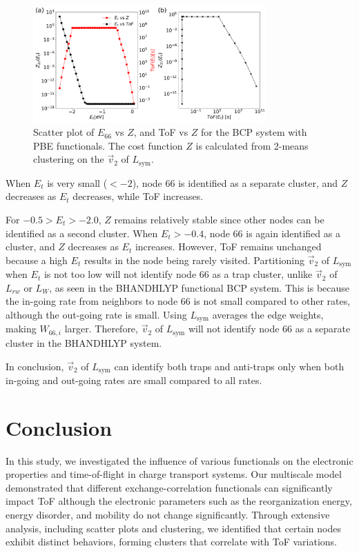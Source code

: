 \documentclass[letterpaper,12pt]{article}
\begin{document}
\begin{figure}
    \centering
    \includegraphics[width=0.8\textwidth]{figs/fig_E_ToF_Z_sym.pdf}
    \caption{Scatter plot of $E_{66}$ vs $Z$, and ToF vs $Z$ for the BCP system with PBE functionals. The cost function $Z$ is calculated from 2-means clustering on the $\vec{v}_2$ of $L_\text{sym}$.}
    \label{fig:fig_E_ToF_Z2_1}
\end{figure}

When $E_t$ is very small ($<-2$), node 66 is identified as a separate cluster, and $Z$ decreases as $E_t$ decreases, while ToF increases. 

For $-0.5 > E_t > -2.0$, $Z$ remains relatively stable since other nodes can be identified as a second cluster. When $E_t > -0.4$, node 66 is again identified as a cluster, and $Z$ decreases as $E_t$ increases. However, ToF remains unchanged because a high $E_t$ results in the node being rarely visited.
Partitioning $\vec{v}_2$ of $L_\text{sym}$ when $E_t$ is not too low will not identify node 66 as a trap cluster, unlike $\vec{v}_2$ of $L_{rw}$ or $L_{W}$, as seen in the BHANDHLYP functional BCP system. This is because the in-going rate from neighbors to node 66 is not small compared to other rates, although the out-going rate is small. Using $L_\text{sym}$ averages the edge weights, making $W_{66,i}$ larger. Therefore, $\vec{v}_2$ of $L_\text{sym}$ will not identify node 66 as a separate cluster in the BHANDHLYP system.

In conclusion, $\vec{v}_2$ of $L_\text{sym}$ can identify both traps and anti-traps only when both in-going and out-going rates are small compared to all rates.

\section{Conclusion}
\label{sec:con}

In this study, we investigated the influence of various functionals on the electronic properties and time-of-flight in charge transport systems. Our multiscale model demonstrated that different exchange-correlation functionals can significantly impact ToF although the electronic parameters such as the reorganization energy, energy disorder, and mobility do not change significantly.
Through extensive analysis, including scatter plots and clustering, we identified that certain nodes exhibit distinct behaviors, forming clusters that correlate with ToF variations.
\end{document}

